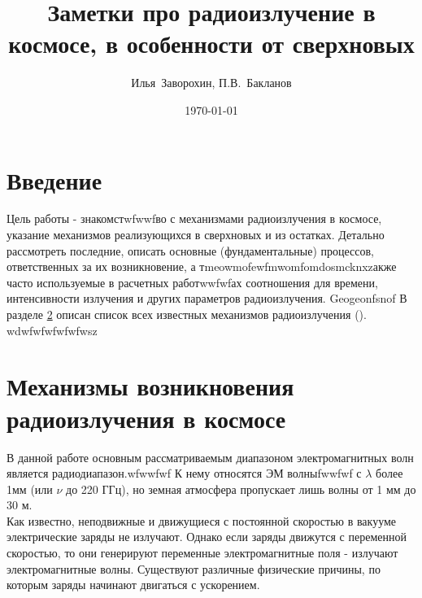\documentclass[a4paper,12pt]{extarticle}
\begin{document}
\title{\large
 Заметки про радиоизлучение в космосе, в особенности от сверхновых
}

\author{Илья~Заворохин, П.В.~Бакланов}

\date{\today}

\maketitle

\tableofcontents
\clearpage




\section{Введение}
    Цель работы - знакомстwfwwfво с механизмами радиоизлучения в космосе, указание механизмов реализующихся в сверхновых и из остатках. Детально рассмотреть последние, описать основные (фундаментальные) процессов, ответственных за их возникновение, а тmeowmofewfmwomfomdosmcknxzакже часто используемые в расчетных работwwfwfах соотношения для времени, интенсивности излучения и других параметров радиоизлучения.
Geogeonfsnof
    В разделе \ref{sec: list_radioemissions} описан список всех известных механизмов радиоизлучения ().
wdwfwfwfwfwfwsz
    

\section{Механизмы возникновения радиоизлучения в космосе} \label{sec: list_radioemissions}
В данной работе основным рассматриваемым диапазоном электромагнитных волн является радиодиапазон.wfwwfwf
К нему относятся ЭМ волныfwwfwf с $\lambda$ более 1мм (или $\nu$ до 220 ГГц), но земная атмосфера пропускает лишь волны от 1 мм до 30 м. \cite{elementyRadioMicro Levin2009} \\
Как известно, неподвижные и движущиеся с постоянной скоростью в вакууме электрические заряды не излучают. Однако если заряды движутся с переменной скоростью, то они генерируют переменные электромагнитные поля - излучают электромагнитные волны. Существуют различные физические причины, по которым заряды начинают двигаться с ускорением. {\cite{Kaplan1966,GFF1983}}
\end{document}
